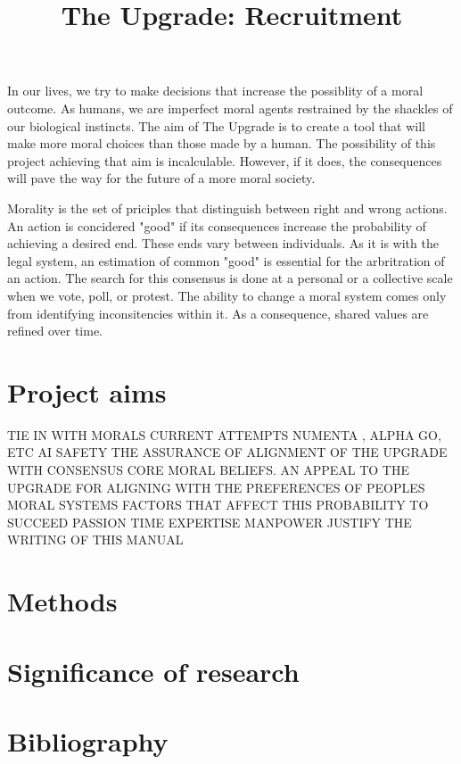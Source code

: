 \documentclass[12pt]{article}
\title{The Upgrade: Recruitment}
\date{\vspace{-5ex}}
\author{\vspace{-5ex}}
\begin{document}
\maketitle

In our lives, we try to make decisions that increase the possiblity of a moral outcome. As humans, we are imperfect moral agents restrained by the shackles of our biological instincts. The aim of The Upgrade is to create a tool that will make more moral choices than those made by a human. The possibility of this project achieving that aim is incalculable. However, if it does, the consequences will pave the way for the future of a more moral society.

Morality is the set of priciples that distinguish between right and wrong actions. An action is concidered "good" if its consequences increase the probability of achieving a desired end. These ends vary between individuals. As it is with the legal system, an estimation of common "good" is essential for the arbritration of an action. The search for this consensus is done at a personal or a collective scale when we vote, poll, or protest. The ability to change a moral system comes only from identifying inconsitencies within it. As a consequence, shared values are refined over time. 

\section*{Project aims}
TIE IN WITH MORALS
CURRENT ATTEMPTS
NUMENTA \cite{numentahome}, ALPHA GO, ETC
AI SAFETY
THE ASSURANCE OF ALIGNMENT OF THE UPGRADE WITH CONSENSUS CORE MORAL BELIEFS.
AN APPEAL TO THE UPGRADE FOR ALIGNING WITH THE PREFERENCES OF PEOPLES MORAL SYSTEMS
FACTORS THAT AFFECT THIS PROBABILITY TO SUCCEED
PASSION
TIME
EXPERTISE
MANPOWER
JUSTIFY THE WRITING OF THIS MANUAL 

\section*{Methods}
\section*{Significance of research}
\section*{Bibliography}

\end{document}
